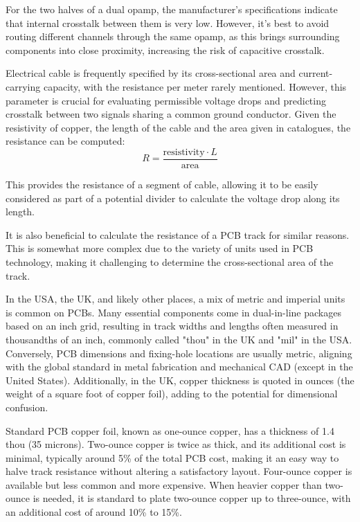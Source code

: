 For the two halves of a dual opamp, the manufacturer’s specifications indicate
that internal crosstalk between them is very low. However, it's best to avoid
routing different channels through the same opamp, as this brings surrounding
components into close proximity, increasing the risk of capacitive crosstalk.

Electrical cable is frequently specified by its cross-sectional area and
current-carrying capacity, with the resistance per meter rarely mentioned.
However, this parameter is crucial for evaluating permissible voltage drops and
predicting crosstalk between two signals sharing a common ground conductor.
Given the resistivity of copper, the length of the cable and the area given in
catalogues, the resistance can be computed:
\[R=\frac{\text{resistivity} \cdot L}{\text{area}}\]

This provides the resistance of a segment of cable, allowing it to be easily
considered as part of a potential divider to calculate the voltage drop along
its length.

It is also beneficial to calculate the resistance of a PCB track for similar
reasons. This is somewhat more complex due to the variety of units used in PCB
technology, making it challenging to determine the cross-sectional area of the
track.

In the USA, the UK, and likely other places, a mix of metric and imperial units
is common on PCBs. Many essential components come in dual-in-line packages
based on an inch grid, resulting in track widths and lengths often measured in
thousandths of an inch, commonly called "thou" in the UK and "mil" in the USA.
Conversely, PCB dimensions and fixing-hole locations are usually metric,
aligning with the global standard in metal fabrication and mechanical CAD
(except in the United States).
Additionally, in the UK, copper thickness is quoted in ounces (the
weight of a square foot of copper foil), adding to the potential for
dimensional confusion.

Standard PCB copper foil, known as one-ounce copper, has a thickness of 1.4
thou (35 microns). Two-ounce copper is twice as thick, and its additional cost
is minimal, typically around 5\% of the total PCB cost, making it an easy way to
halve track resistance without altering a satisfactory layout. Four-ounce
copper is available but less common and more expensive. When heavier copper
than two-ounce is needed, it is standard to plate two-ounce copper up to
three-ounce, with an additional cost of around 10\% to 15\%.

